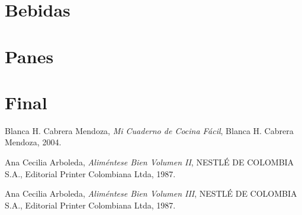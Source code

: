 \documentclass[letterpaper,10pt,twoside]{book}
\begin{document}
\part{Bebidas}
\makeatletter\@openrightfalse

\@openrighttrue\makeatother
\part{Panes}
\makeatletter\@openrightfalse



\@openrighttrue\makeatother
\part{Final}
\backmatter
\printindex
{}
\begin{thebibliography}{9}

  Blanca H. Cabrera Mendoza,
  \textit{Mi Cuaderno de Cocina Fácil},
  Blanca H. Cabrera Mendoza,
  2004.

  Ana Cecilia Arboleda,
  \textit{Aliméntese Bien Volumen II},
  NESTLÉ DE COLOMBIA S.A., Editorial Printer Colombiana Ltda,
  1987.

  Ana Cecilia Arboleda,
  \textit{Aliméntese Bien Volumen III},
  NESTLÉ DE COLOMBIA S.A., Editorial Printer Colombiana Ltda,
  1987.


\end{thebibliography}
%
\end{document}

